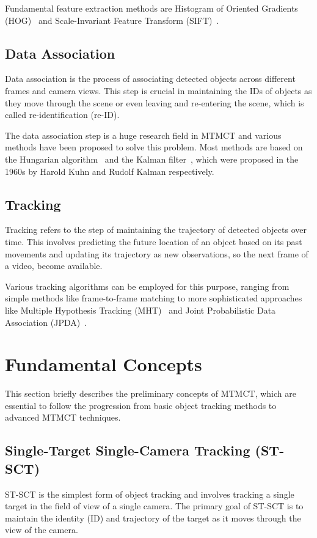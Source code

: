 Fundamental feature extraction methods are Histogram of Oriented Gradients (HOG)~\cite{Dalal05} and Scale-Invariant Feature Transform (SIFT)~\cite{Lowe04}.

\subsection{Data Association}\label{subsec:data_association}
Data association is the process of associating detected objects across different frames and camera views. This step is crucial in maintaining the IDs of objects as they move through the scene or even leaving and re-entering the scene, which is called re-identification (re-ID).

The data association step is a huge research field in MTMCT and various methods have been proposed to solve this problem. Most methods are based on the Hungarian algorithm~\cite{Kuhn55} and the Kalman filter~\cite{Kalman60}, which were proposed in the 1960s by Harold Kuhn and Rudolf Kalman respectively.

\subsection{Tracking}\label{subsec:tracking}
Tracking refers to the step of maintaining the trajectory of detected objects over time. This involves predicting the future location of an object based on its past movements and updating its trajectory as new observations, so the next frame of a video, become available.

Various tracking algorithms can be employed for this purpose, ranging from simple methods like frame-to-frame matching to more sophisticated approaches like Multiple Hypothesis Tracking (MHT)~\cite{Blackman04} and Joint Probabilistic Data Association (JPDA)~\cite{Reid79}.

\section{Fundamental Concepts}\label{sec:fundamental_concepts}
This section briefly describes the preliminary concepts of MTMCT, which are essential to follow the progression from basic object tracking methods to advanced MTMCT techniques.

\subsection{Single-Target Single-Camera Tracking (ST-SCT)}\label{subsec:st_sct}
ST-SCT is the simplest form of object tracking and involves tracking a single target in the field of view of a single camera. The primary goal of ST-SCT is to maintain the identity (ID) and trajectory of the target as it moves through the view of the camera.

